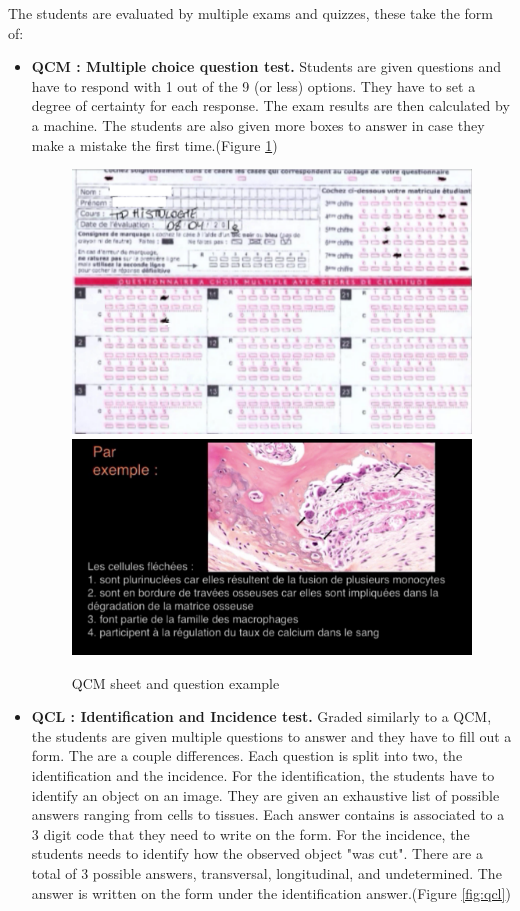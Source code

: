 \documentclass[a4paper,11pt]{report}
\numberwithin{figure}{chapter} %
\begin{document}
	The students are evaluated by multiple exams and quizzes, these take the form of:
    \begin{itemize}
    \item[\textbullet]  \textbf{QCM : Multiple choice question test.}
    Students are given questions and have to respond with 1 out of the 9 (or less) options.
    They have to set a degree of certainty for each response.
    The exam results are then calculated by a machine.
    The students are also given more boxes to answer in case they make a mistake the first time.(Figure \ref{fig:qcm})
    \begin{figure}[H]
    \centering
     \includegraphics[width=0.4\linewidth]{images/exam_qcm.png}
     \includegraphics[width=0.5\linewidth]{images/exam_qcm2.png}
     \caption{QCM sheet and question example}
     \label{fig:qcm}
    \end{figure}
	\item[\textbullet]  \textbf{QCL : Identification and Incidence test.}
	Graded similarly to a QCM, the students are given multiple questions to answer and they have to fill out a form.
	The are a couple differences.
	Each question is split into two, the identification and the incidence.
	For the identification, the students have to identify an object on an image.
	They are given an exhaustive list of possible answers ranging from cells to tissues.
	Each answer contains is associated to a 3 digit code that they need to write on the form.
	For the incidence, the students needs to identify how the observed object "was cut".
	There are a total of 3 possible answers, transversal, longitudinal, and undetermined.
	The answer is written on the form under the identification answer.(Figure \ref{fig:qcl})
      \begin{figure}[H]
    \centering

\end{figure}
\end{itemize}
\end{document}
